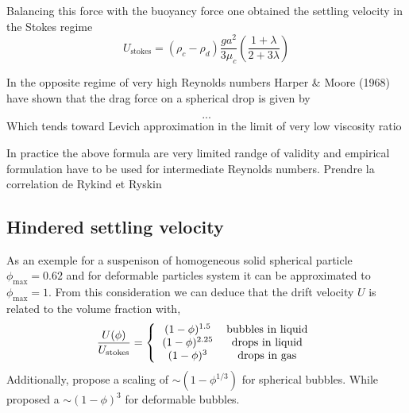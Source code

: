 Balancing this force with the buoyancy force one obtained the settling velocity in the Stokes regime
\begin{equation*}
    U_\text{stokes}
    = (\rho_c - \rho_d)\frac{g a^2}{3\mu_c}\left(\frac{1+\lambda}{2 + 3\lambda}\right)
\end{equation*}

In the opposite regime of very high Reynolds numbers Harper \& Moore (1968) have shown that the drag force on a spherical drop is given by 

\begin{equation}
...
\end{equation}
Which tends toward Levich approximation in the limit of very low viscosity ratio


In practice the above formula are very limited randge of validity and empirical formulation have to be used for intermediate Reynolds numbers. Prendre la correlation de Rykind et Ryskin



\subsection{Hindered settling velocity}
As an exemple for a suspenison of homogeneous solid spherical particle $\phi_\text{max} = 0.62$ and for deformable particles system it can be approximated to $\phi_\text{max} = 1$. 
From this consideration we can deduce that the drift velocity $U$ is related to the volume fraction with, 
\begin{equation*}
    \frac{U(\phi)}{U_\text{stokes}} = \left\{\begin{tabular}{cc}
        $(1-\phi)^{1.5}$   & bubbles in liquid \\
        $(1-\phi)^{2.25}$   & drops in liquid \\
        $(1-\phi)^{3}$   & drops in gas \\
    \end{tabular}\right.
\end{equation*} 
Additionally, \citet{bunner2003effect} propose a scaling of $\sim (1 - \phi^{1/3})$ for spherical bubbles.
While \citet{ishii1979drag} proposed a $\sim (1 - \phi)^3$ for deformable bubbles. 

